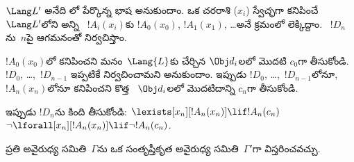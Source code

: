 \documentclass[../../../include/open-logic-section]{subfiles}
\begin{document}
\begin{defn}
$\Lang L'$ అనేది లో పేర్కొన్న భాష అనుకుందాం.
ఒక చరరాశి ($x_i$) స్వేచ్ఛగా కనిపించే~$\Lang L'$లోని అన్ని
~$!A_i(x_i)$కు $!A_0(x_0)$, $!A_1(x_1)$, \dots అనే
క్రమంలో లెక్కిద్దాం. ~$!D_n$ను~$n$పై ఆగమనంతో
నిర్వచిస్తాం.

$!A_0(x_0)$లో కనిపించని మనం~$\Lang{L}$కు చేర్చిన $\Obj d_i$లలో
మొదటి  $c_0$గా తీసుకోండి. $!D_0$, \dots,~$!D_{n-1}$
ఇప్పటికే నిర్వచించామని అనుకుందాం. ఇప్పుడు $!D_0$, \dots,~$!D_{n-1}$లోనూ,
$!A_n(x_n)$లోనూ కనిపించని కొత్త ~$\Obj d_i$లలో మొదటిదాన్ని
$c_n$గా తీసుకోండి.

ఇప్పుడు $!D_{n}$ను కింది  తీసుకోండి:
{$\lexists[x_{n}][!A_{n}(x_{n})] \lif
  !A_{n}(c_{n})$}{$\lnot\lforall[x_{n}][!A_{n}(x_{n})] \lif \lnot
  !A_{n}(c_{n})$}.
\end{defn}

\begin{lem}
ప్రతి అవైరుధ్య సమితి~$\Gamma$ను ఒక సంతృప్తీకృత అవైరుధ్య
సమితి~$\Gamma'$గా విస్తరించవచ్చు.
\end{lem}
\end{document}
